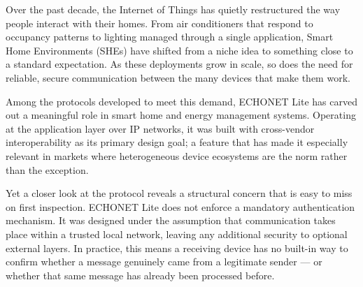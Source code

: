 \documentclass[11pt,a4paper]{article}
\begin{document}
\begin{sectioncard}


Over the past decade, the Internet of Things has quietly restructured the way people interact
with their homes. From air conditioners that respond to occupancy patterns to lighting managed
through a single application, Smart Home Environments (SHEs) have shifted from a niche idea
to something close to a standard expectation. As these deployments grow in scale, so does the
need for reliable, secure communication between the many devices that make them work.

Among the protocols developed to meet this demand, ECHONET Lite has carved out a meaningful
role in smart home and energy management systems. Operating at the application layer over IP
networks, it was built with cross-vendor interoperability as its primary design goal; a feature
that has made it especially relevant in markets where heterogeneous device ecosystems are the
norm rather than the exception.

Yet a closer look at the protocol reveals a structural concern that is easy to miss on first
inspection. ECHONET Lite does not enforce a mandatory authentication mechanism. It was
designed under the assumption that communication takes place within a trusted local network,
leaving any additional security to optional external layers. In practice, this means a receiving
device has no built-in way to confirm whether a message genuinely came from a legitimate
sender — or whether that same message has already been processed before.


\end{sectioncard}
\end{document}
